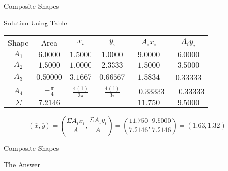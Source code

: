 \documentclass[9pt, xcolor={svgnames, x11names},professionalfonts]{beamer}
\def\scale{1}
\begin{document}
\begin{frame}{Composite Shapes}
	\begin{myexam}[height=7cm]{Solution Using Table}{}
		\small
			\vspace{0.8cm}
		\centering
		\begin{tabular}{cccccc}
			Shape            & Area                          & $x_i$               & $y_i$               & $A_ix_i$                        & $A_iy_i$                        \\
			\addlinespace
			\midrule
			$A_1$            & $6.0000$                      & $1.5000$            & $1.0000$            & \textcolor{saitRed}{$9.0000$}   & \textcolor{saitRed}{$6.0000$}   \\
			\midrule
			$A_2$            & $1.5000$                      & $1.0000$            & $2.3333$            & \textcolor{saitRed}{$1.5000$}   & \textcolor{saitRed}{$3.5000$}   \\
			\midrule
			$A_3$            & $0.50000$                     & $3.1667$            & $0.66667$           & \textcolor{saitRed}{$1.5834$}   & \textcolor{saitRed}{0.33333}    \\
			\midrule
			$A_4$            & $\bm -\frac{\pi}{4}$          & $\frac{4(1)}{3\pi}$ & $\frac{4(1)}{3\pi}$ & \textcolor{saitRed}{$-0.33333$} & \textcolor{saitRed}{$-0.33333$} \\
			\bottomrule\addlinespace
			{\Large$\Sigma$} & \textcolor{saitRed}{$7.2146$} &                     &                     & \textcolor{saitRed}{$11.750$}   & \textcolor{saitRed}{$9.5000$}
		\end{tabular}

		\parb
		\centering
		\normalsize
		$$\left(\overline{x},\overline{y}\right)=\left(\frac{\Sigma A_ix_i}{A},\frac{\Sigma A_iy_i}{A}\right)=\left(\frac{11.750}{7.2146}, \frac{9.5000}{7.2146}\right)=(1.63,1.32)$$
		\addtocounter{\tcbcounter}{-1}
	\end{myexam}
\end{frame}

\begin{frame}{Composite Shapes}
	\begin{myexam}[height=7cm]{The Answer}{}
		\centering
		\vspace{0.5cm}
		\def\scale{1}
		
	\end{myexam}
\end{frame}
\end{document}
